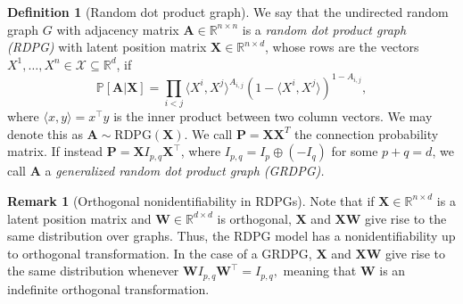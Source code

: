 \documentclass[12pt]{article}
\newcommand{\RR}{\mathbb{R}}
\newcommand{\PP}{\mathbb{P}}
\theoremstyle{definition}
\newtheorem{definition}{Definition}
\newtheorem{remark}{Remark}
\newcommand{\R}{\mathbb{R}}
\newcommand{\bA}{\mathbf{A}}
\newcommand{\bP}{\mathbf{P}}
\newcommand{\bW}{\mathbf{W}}
\newcommand{\bX}{\mathbf{X}}
\begin{document}






\begin{definition}[Random dot product graph]
We say that the undirected random graph $G$ with adjacency matrix $\bA\in\RR^{n\times n}$ is a \emph{random dot product graph (RDPG)} with latent position matrix $\bX\in\RR^{n\times d}$, whose rows are the vectors $X^1,\ldots,X^n\in\mathcal{X}\subseteq\RR^d$, if
$$\PP[\bA|\bX]=\prod_{i<j}\langle X^i,X^j \rangle^{A_{i,j}}(1- \langle X^i,X^j \rangle)^{1-A_{i,j}},$$
where $\langle x,y\rangle= x^\top y$ is the inner product between two column vectors. We may denote this as $\bA\sim\mathrm{RDPG}(\bX)$. We call $\bP=\bX \bX^T$ the connection probability matrix. 
If instead $\bP = \bX I_{p,q}\bX^\top$, where $I_{p,q}=I_p\oplus(-I_q)$ for some $p+q=d$, we call $\bA$ a \emph{generalized random dot product graph (GRDPG).}
\end{definition}

\begin{remark}[Orthogonal nonidentifiability in RDPGs] \label{rem:nonid}
Note that if $\bX \in \R^{n \times d}$ is a latent position matrix
and $\bW \in \R^{d \times d}$ is orthogonal,
$\bX$ and $\bX\bW$ give rise to the same distribution over graphs.
Thus, the RDPG model has a nonidentifiability up to orthogonal transformation. In the case of a GRDPG, $\bX$ and $\bX\bW$ give rise to the same distribution whenever $\bW I_{p,q} \bW^\top=I_{p,q},$ meaning that $\bW$ is an indefinite orthogonal transformation.
\end{remark}
\end{document}

